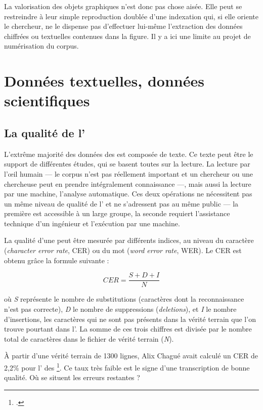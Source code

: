 La valorisation des objets graphiques n'est donc pas chose aisée. Elle peut se restreindre à leur simple reproduction doublée d'une indexation qui, si elle oriente le chercheur, ne le dispense pas d'effectuer lui-même l'extraction des données chiffrées ou textuelles contenues dans la figure. Il y a ici une limite au projet de numérisation du corpus.

\newpage
\thispagestyle{empty}
\mbox{}
\newpage

\chapter{Données textuelles, données scientifiques}

\section{La qualité de l'\ocr}

L'extrême majorité des données des \odm{} est composée de texte. Ce texte peut être le support de différentes études, qui se basent toutes sur la lecture. La lecture par l'\oe{}il humain --- le corpus n'est pas réellement important et un chercheur ou une chercheuse peut en prendre intégralement connaissance ---, mais aussi la lecture par une machine, \cad{} l'analyse automatique. Ces deux opérations ne nécessitent pas un même niveau de qualité de l'\ocr{} et ne s'adressent pas au même public --- la première est accessible à un large groupe, la seconde requiert l'assistance technique d'un ingénieur et l'exécution par une machine.

La qualité d'une \ocr{} peut être mesurée par différents indices, au niveau du caractère (\textit{character error rate}, CER) ou du mot (\textit{word error rate}, WER).  Le CER est obtenu grâce la formule suivante :

\[CER = \frac{S + D + I}{N}\]

où \textit{S} représente le nombre de substitutions (caractères dont la reconnaissance n'est pas correcte), \textit{D} le nombre de suppressions (\textit{deletions}), et \textit{I} le nombre d'insertions, \cad{} les caractères qui ne sont pas présents dans la vérité terrain que l'on trouve pourtant dans l'\ocr. La somme de ces trois chiffres est divisée par le nombre total de caractères dans le fichier de vérité terrain (\textit{N}).

À partir d'une vérité terrain de 1300 lignes, Alix Chagué avait calculé un CER de 2,2\% pour l'\ocr{} des \odm\footcite[slide 16]{inria-pp}. Ce taux très faible est le signe d'une transcription de bonne qualité. Où se situent les erreurs restantes ?

